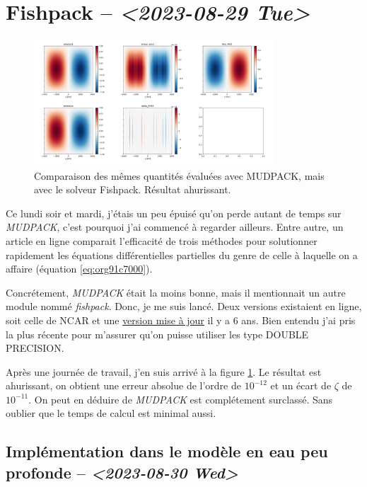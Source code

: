 \documentclass[10pt]{article}
\numberwithin{equation}{section}
\begin{document}
\section{Fishpack -- \textit{<2023-08-29 Tue>}}
\label{sec:org64422e4}

\begin{figure}[!htpb]
\centering
\includegraphics[width=0.8\textwidth]{figures/fishpack/2023-08-29-fishtest.png}
\caption{\label{fig:org8154c24}Comparaison des mêmes quantités évaluées avec MUDPACK, mais avec le solveur Fishpack. Résultat ahurissant.}
\end{figure}

Ce lundi soir et mardi, j'étais un peu épuisé qu'on perde autant de temps sur \emph{MUDPACK}, c'est pourquoi j'ai commencé à regarder ailleurs.
Entre autre, un article en ligne comparait l'efficacité de trois méthodes pour solutionner rapidement les équations différentielles partielles du genre de celle à laquelle on a affaire (équation \ref{eq:org91c7000}).\bigskip

Concrétement, \emph{MUDPACK} était la moins bonne, mais il mentionnait un autre module nommé \emph{fishpack}.
Donc, je me suis lancé.
Deux versions existaient en ligne, soit celle de NCAR et une \href{https://github.com/jlokimlin/fishpack}{version mise à jour} il y a 6 ans.
Bien entendu j'ai pris la plus récente pour m'assurer qu'on puisse utiliser les type DOUBLE PRECISION.\bigskip

Après une journée de travail, j'en suis arrivé à la figure \ref{fig:org8154c24}.
Le résultat est ahurissant, on obtient une erreur absolue de l'ordre de \(10^{-12}\) et un écart de \(\zeta\) de \(10^{-11}\).
On peut en déduire de \emph{MUDPACK} est complétement surclassé.
Sans oublier que le temps de calcul est minimal aussi.

\subsection{Implémentation dans le modèle en eau peu profonde -- \textit{<2023-08-30 Wed>}}
\label{sec:org12c5cee}
\end{document}

